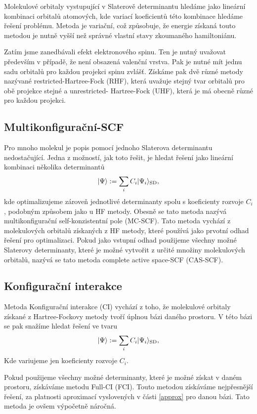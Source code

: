 Molekulové orbitaly vystupující v Slaterově determinantu hledáme jako lineární
kombinaci orbitalů 
atomových, kde variací koeficientů této kombinace hledáme řešení problému.
Metoda je variační, což způsobuje, že energie získaná touto metodou je nutně vyšší než 
správné vlastní stavy zkoumaného hamiltoniánu.

Zatím jsme zanedbávali efekt elektronového spinu. Ten je nutný uvažovat především v 
případě, že není obsazená valenční vrstva. Pak je nutné mít jednu sadu orbitalů pro 
každou projekci spinu zvlášť. Získáme pak dvě různé metody nazývané restricted-Hartree-Fock 
(RHF), která uvažuje stejný tvar orbitalů pro obě projekce stejné a unrestricted-
Hartree-Fock (UHF), která je má obecně různé pro každou projekci.

\subsection{Multikonfigurační-SCF}
Pro mnoho molekul je popis pomocí jednoho Slaterova determinantu nedostačující.
Jedna z možností, jak toto řešit, je hledat řešení jako lineární kombinaci několika determinantů
\begin{equation}
| \Psi \rangle := \sum_i C_i | \Psi_i \rangle_{\mathrm{SD}},
\end{equation}
kde optimalizujeme zároveň jednotlivé determinanty spolu s koeficienty rozvoje $C_i$, 
podobným způsobem jako u HF metody.
Obesně se tato metoda nazývá multikonfigurační self-konzistentní pole (MC-SCF).
Tato metoda vychází z molekulových orbitalů získaných z HF metody, které používá jako 
prvotní odhad řešení pro optimalizaci.
Pokud jako vstupní odhad použijeme všechny možné Slaterovy determinanty, které je možné  
vytvořit z určité množiny molekulových orbitalů, nazývá se tato metoda complete active space-SCF (CAS-SCF). 

\subsection{Konfigurační interakce}
Metoda Konfigurační interakce (CI) vychází z toho, že molekulové orbitaly získané z Hartree-Fockovy metody tvoří úplnou bázi daného prostoru. V této bázi se pak snažíme hledat řešení ve tvaru
\begin{equation}
| \Psi \rangle := \sum_i C_i | \Psi_i \rangle_{\mathrm{SD}},
\end{equation}
Kde variujeme jen koeficienty rozvoje $C_i$.

Pokud použijeme všechny možné determinanty, které je možné získat v daném prostoru, 
získáváme metodu Full-CI (FCI). Touto metodou získáváme nejpřesnější řešení, za 
platnosti aproximací vyslovených v části \ref{approx} pro danou bázi. Tato metoda je 
ovšem výpočetně náročná.

